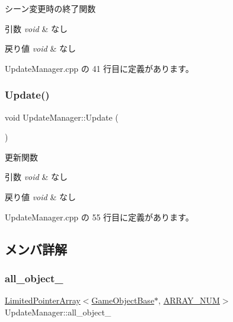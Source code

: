 シーン変更時の終了関数 


\begin{DoxyParams}{引数}
{\em void} & なし \\
\hline
\end{DoxyParams}

\begin{DoxyRetVals}{戻り値}
{\em void} & なし \\
\hline
\end{DoxyRetVals}


 Update\+Manager.\+cpp の 41 行目に定義があります。

\mbox{\label{class_update_manager_ac4bdd39d106c7e6b505fe9a0c55e50de}} 
\subsubsection{\texorpdfstring{Update()}{Update()}}
{\footnotesize\ttfamily void Update\+Manager\+::\+Update (\begin{DoxyParamCaption}{ }\end{DoxyParamCaption})}



更新関数 


\begin{DoxyParams}{引数}
{\em void} & なし \\
\hline
\end{DoxyParams}

\begin{DoxyRetVals}{戻り値}
{\em void} & なし \\
\hline
\end{DoxyRetVals}


 Update\+Manager.\+cpp の 55 行目に定義があります。



\subsection{メンバ詳解}
\mbox{\label{class_update_manager_a3943ecea6d685d2aba94dc227a911b52}} 
\subsubsection{\texorpdfstring{all\+\_\+object\+\_\+}{all\_object\_}}
{\footnotesize\ttfamily \mbox{\hyperlink{class_limited_pointer_array}{Limited\+Pointer\+Array}}$<$\mbox{\hyperlink{class_game_object_base}{Game\+Object\+Base}}$\ast$, \mbox{\hyperlink{class_update_manager_a280b884fb6a025cfd92d4f93086c60c6}{A\+R\+R\+A\+Y\+\_\+\+N\+UM}}$>$ Update\+Manager\+::all\+\_\+object\+\_\+\hspace{0.3cm}{\ttfamily [private]}}



